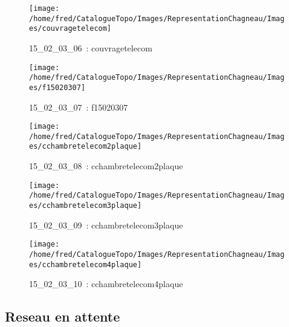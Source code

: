 \documentclass[12pt,titlepage]{book}
\begin{document}
\begin{figure}[h!]
\begin{minipage}[t]{3cm}
    \begin{center}
      \texttt{[image: /home/fred/CatalogueTopo/Images/RepresentationChagneau/Images/couvragetelecom]}
      \caption[~15\_02\_03\_06]{\small{15\_02\_03\_06~:} \tiny{couvragetelecom}}\label{couvragetelecom}
    \end{center}
  \end{minipage}
  \begin{minipage}[t]{3cm}
    \begin{center}
      \texttt{[image: /home/fred/CatalogueTopo/Images/RepresentationChagneau/Images/f15020307]}
      \caption[~15\_02\_03\_07]{\small{15\_02\_03\_07~:} \tiny{f15020307}}\label{f15020307}
    \end{center}
  \end{minipage}
  \begin{minipage}[t]{3cm}
    \begin{center}
      \texttt{[image: /home/fred/CatalogueTopo/Images/RepresentationChagneau/Images/cchambretelecom2plaque]}
      \caption[~15\_02\_03\_08]{\small{15\_02\_03\_08~:} \tiny{cchambretelecom2plaque}}\label{cchambretelecom2plaque}
    \end{center}
  \end{minipage}
  \begin{minipage}[t]{3cm}
    \begin{center}
      \texttt{[image: /home/fred/CatalogueTopo/Images/RepresentationChagneau/Images/cchambretelecom3plaque]}
      \caption[~15\_02\_03\_09]{\small{15\_02\_03\_09~:} \tiny{cchambretelecom3plaque}}\label{cchambretelecom3plaque}
    \end{center}
  \end{minipage}
  \begin{minipage}[t]{3cm}
    \begin{center}
      \texttt{[image: /home/fred/CatalogueTopo/Images/RepresentationChagneau/Images/cchambretelecom4plaque]}
      \caption[~15\_02\_03\_10]{\small{15\_02\_03\_10~:} \tiny{cchambretelecom4plaque}}\label{cchambretelecom4plaque}
    \end{center}
  \end{minipage}
\end{figure}
\subsection{Reseau en attente}
\end{document}
